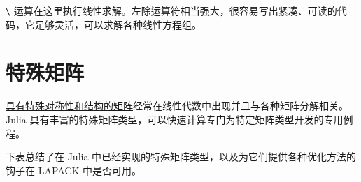 \texttt{{\textbackslash}} 运算在这里执行线性求解。左除运算符相当强大，很容易写出紧凑、可读的代码，它足够灵活，可以求解各种线性方程组。



\hypertarget{16591042520207219529}{}


\section{特殊矩阵}



\href{http://www2.imm.dtu.dk/pubdb/views/publication\_details.php?id=3274}{具有特殊对称性和结构的矩阵}经常在线性代数中出现并且与各种矩阵分解相关。Julia 具有丰富的特殊矩阵类型，可以快速计算专门为特定矩阵类型开发的专用例程。



下表总结了在 Julia 中已经实现的特殊矩阵类型，以及为它们提供各种优化方法的钩子在 LAPACK 中是否可用。





